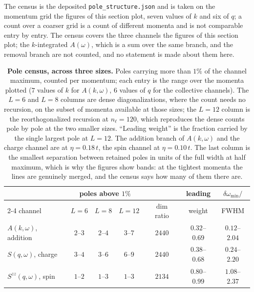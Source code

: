 The census is the deposited \texttt{pole\_structure.json} and is taken on the momentum grid the figures of
this section plot, seven values of $k$ and six of $q$; a count over a coarser grid is a count of
different momenta and is not comparable entry by entry. The
census covers the three channels the figures of this section plot; the $k$-integrated $A(\omega)$,
which is a sum over the same branch, and the removal branch are not counted, and no statement is made
about them here.

\begin{table}[tp]\centering\small
\caption{\textbf{Pole census, across three sizes.} Poles carrying more than $1\%$ of the channel
maximum, counted per momentum; each entry is the range over the momenta plotted ($7$ values of $k$ for
$A(k,\omega)$, $6$ values of $q$ for the collective channels). The $L=6$ and $L=8$ columns are dense
diagonalizations, where the count needs no recursion, on the subset of momenta available at those
sizes; the $L=12$ column is the reorthogonalized recursion at $n_\ell=120$, which reproduces the dense
counts pole by pole at the two smaller sizes. ``Leading weight'' is the fraction carried by the single
largest pole at $L=12$. The addition branch of $A(k,\omega)$ and the charge channel are at
$\eta=0.18\,t$, the spin channel at $\eta=0.10\,t$. The last column is the smallest separation between
retained poles in units of the full width at half maximum, which is why the figures show bands: at the
tightest momenta the lines are genuinely merged, and the census says how many of them there
are.}\label{tab:poles}
\setlength{\tabcolsep}{4pt}
\begin{tabular}{lcccccc}
\toprule
 & \multicolumn{3}{c}{poles above $1\%$} & & leading & $\delta\omega_{\min}/$\\
\cmidrule(lr){2-4}
channel & $L{=}6$ & $L{=}8$ & $L{=}12$ & $\dim$ ratio & weight & FWHM\\
\midrule
$A(k,\omega)$, addition  & $2$--$3$ & $2$--$4$ & $3$--$7$ & $2440$ & $0.32$--$0.69$ & $0.12$--$2.04$\\
$S(q,\omega)$, charge    & $3$--$4$ & $3$--$6$ & $6$--$9$ & $2440$ & $0.38$--$0.68$ & $0.24$--$2.20$\\
$S^{zz}(q,\omega)$, spin & $1$--$2$ & $1$--$3$ & $1$--$3$ & $2134$ & $0.80$--$0.99$ & $1.08$--$2.37$\\
\bottomrule
\end{tabular}
\end{table}

